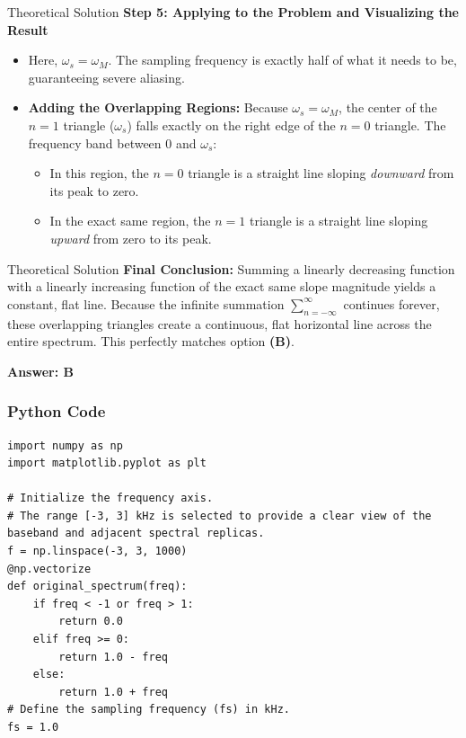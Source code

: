 \documentclass{beamer}
\begin{document}
\begin{frame}{Theoretical Solution}
\textbf{Step 5: Applying to the Problem and Visualizing the Result}
\begin{itemize}
    \item  Here, $\omega_s = \omega_M$. The sampling frequency is exactly half of what it needs to be, guaranteeing severe aliasing.
    \item \textbf{Adding the Overlapping Regions:} Because $\omega_s = \omega_M$, the center of the $n=1$ triangle ($\omega_s$) falls exactly on the right edge of the $n=0$ triangle. The frequency band between $0$ and $\omega_s$:
    \begin{itemize}
        \item In this region, the $n=0$ triangle is a straight line sloping \textit{downward} from its peak to zero.
        \item In the exact same region, the $n=1$ triangle is a straight line sloping \textit{upward} from zero to its peak.
    \end{itemize}
\end{itemize}
\end{frame}

\begin{frame}{Theoretical Solution}
    \textbf{Final Conclusion:} Summing a linearly decreasing function with a linearly increasing function of the exact same slope magnitude yields a constant, flat line. Because the infinite summation $\sum_{n=-\infty}^{\infty}$ continues forever, these overlapping triangles create a continuous, flat horizontal line across the entire spectrum. This perfectly matches option \textbf{(B)}.

    \textbf{Answer: B} 
\end{frame}

\begin{frame}[fragile]
    \frametitle{Python Code}
    \begin{lstlisting}
import numpy as np
import matplotlib.pyplot as plt

# Initialize the frequency axis. 
# The range [-3, 3] kHz is selected to provide a clear view of the baseband and adjacent spectral replicas.
f = np.linspace(-3, 3, 1000)
@np.vectorize  
def original_spectrum(freq):
    if freq < -1 or freq > 1:
        return 0.0
    elif freq >= 0:
        return 1.0 - freq
    else: 
        return 1.0 + freq
# Define the sampling frequency (fs) in kHz.
fs = 1.0
   

\end{lstlisting}
\end{frame}
\end{document}
